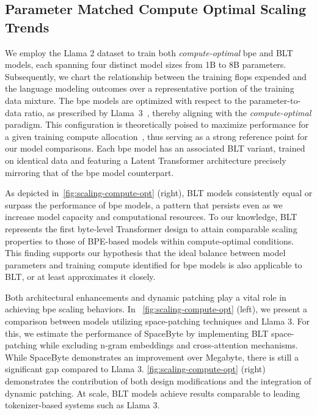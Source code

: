 \subsection{Parameter Matched Compute Optimal Scaling Trends}
\label{section:parameter-matched-scaling}
We employ the Llama 2 dataset to train both \textit{compute-optimal} bpe and {\textsc BLT} models, each spanning four distinct model sizes from 1B to 8B parameters. Subsequently, we chart the relationship between the training flops expended and the language modeling outcomes over a representative portion of the training data mixture. The bpe models are optimized with respect to the parameter-to-data ratio, as prescribed by Llama~3~\citep{dubey2024llama}, thereby aligning with the \textit{compute-optimal} paradigm. This configuration is theoretically poised to maximize performance for a given training compute allocation~\citep{hoffmann2022training}, thus serving as a strong reference point for our model comparisons. Each bpe model has an associated {\textsc BLT} variant, trained on identical data and featuring a Latent Transformer architecture precisely mirroring that of the bpe model counterpart.

As depicted in~\autoref{fig:scaling-compute-opt} (right), {\textsc BLT} models consistently equal or surpass the performance of bpe models, a pattern that persists even as we increase model capacity and computational resources. To our knowledge, {\textsc BLT} represents the first byte-level Transformer design to attain comparable scaling properties to those of BPE-based models within compute-optimal conditions. This finding supports our hypothesis that the ideal balance between model parameters and training compute identified for bpe models is also applicable to {\textsc BLT}, or at least approximates it closely.

Both architectural enhancements and dynamic patching play a vital role in achieving bpe scaling behaviors. In ~\autoref{fig:scaling-compute-opt} (left), we present a comparison between models utilizing space-patching techniques and Llama 3. For this, we estimate the performance of SpaceByte \citep{slagle2024spacebyte} by implementing {\textsc BLT} space-patching while excluding n-gram embeddings and cross-attention mechanisms. While SpaceByte demonstrates an improvement over Megabyte, there is still a significant gap compared to Llama 3. \autoref{fig:scaling-compute-opt} (right) demonstrates the contribution of both design modifications and the integration of dynamic patching. At scale, {\textsc BLT} models achieve results comparable to leading tokenizer-based systems such as Llama 3.

